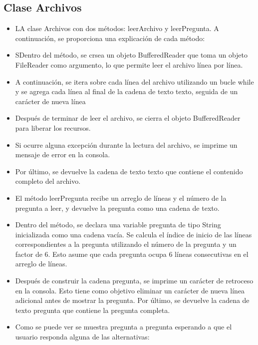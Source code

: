 \documentclass{article}
\begin{document}
	\subsection{Clase Archivos}
	\begin{itemize}	
		\item LA clase Archivos con dos métodos: leerArchivo y leerPregunta. A continuación, se proporciona una explicación de cada método:
	\end{itemize}	
		
	\begin{itemize}	
		\item SDentro del método, se crsea un objeto BufferedReader que toma un objeto FileReader como argumento, lo que permite leer el archivo línea por línea.
		\item A continuación, se itera sobre cada línea del archivo utilizando un bucle while y se agrega cada línea al final de la cadena de texto texto, seguida de un carácter de nueva línea 
		\item Después de terminar de leer el archivo, se cierra el objeto BufferedReader para liberar los recursos.
		\item Si ocurre alguna excepción durante la lectura del archivo, se imprime un mensaje de error en la consola.
		\item Por último, se devuelve la cadena de texto texto que contiene el contenido completo del archivo.
		\item El método leerPregunta recibe un arreglo de líneas y el número de la pregunta a leer, y devuelve la pregunta como una cadena de texto.
		\item Dentro del método, se declara una variable pregunta de tipo String inicializada como una cadena vacía.
		Se calcula el índice de inicio de las líneas correspondientes a la pregunta utilizando el número de la pregunta y un factor de 6. Esto asume que cada pregunta ocupa 6 líneas consecutivas en el arreglo de líneas.
		\item Después de construir la cadena pregunta, se imprime un carácter de retroceso en la consola. Esto tiene como objetivo eliminar un carácter de nueva línea adicional antes de mostrar la pregunta.
		Por último, se devuelve la cadena de texto pregunta que contiene la pregunta completa.
	\end{itemize}


	\begin{itemize}	
		\item Como se puede ver se muestra pregunta a pregunta esperando a que el usuario responda alguna de las alternativas:
	\end{itemize}	
	
\end{document}
